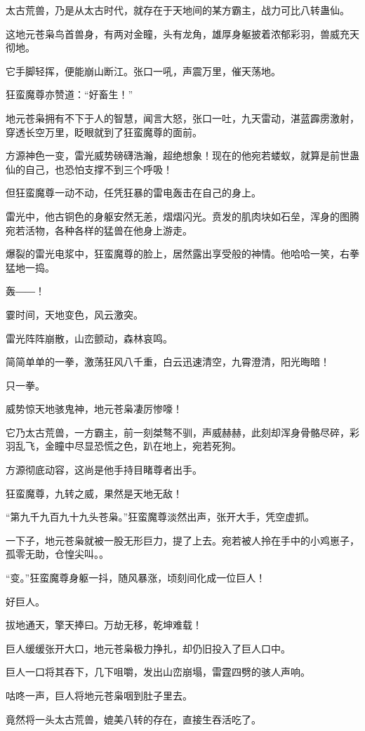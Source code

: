 \begin{this_body}
太古荒兽，乃是从太古时代，就存在于天地间的某方霸主，战力可比八转蛊仙。

这地元苍枭鸟首兽身，有两对金瞳，头有龙角，雄厚身躯披着浓郁彩羽，兽威充天彻地。

它手脚轻挥，便能崩山断江。张口一吼，声震万里，催天荡地。

狂蛮魔尊亦赞道：“好畜生！”

地元苍枭拥有不下于人的智慧，闻言大怒，张口一吐，九天雷动，湛蓝霹雳激射，穿透长空万里，眨眼就到了狂蛮魔尊的面前。

方源神色一变，雷光威势磅礴浩瀚，超绝想象！现在的他宛若蝼蚁，就算是前世蛊仙的自己，也恐怕支撑不到三个呼吸！

但狂蛮魔尊一动不动，任凭狂暴的雷电轰击在自己的身上。

雷光中，他古铜色的身躯安然无恙，熠熠闪光。贲发的肌肉块如石垒，浑身的图腾宛若活物，各种各样的猛兽在他身上游走。

爆裂的雷光电浆中，狂蛮魔尊的脸上，居然露出享受般的神情。他哈哈一笑，右拳猛地一捣。

轰――！

霎时间，天地变色，风云激突。

雷光阵阵崩散，山峦颤动，森林哀鸣。

简简单单的一拳，激荡狂风八千重，白云迅速清空，九霄澄清，阳光晦暗！

只一拳。

威势惊天地骇鬼神，地元苍枭凄厉惨嚎！

它乃太古荒兽，一方霸主，前一刻桀骜不驯，声威赫赫，此刻却浑身骨骼尽碎，彩羽乱飞，金瞳中尽显恐慌之色，趴在地上，宛若死狗。

方源彻底动容，这尚是他手持目睹尊者出手。

狂蛮魔尊，九转之威，果然是天地无敌！

“第九千九百九十九头苍枭。”狂蛮魔尊淡然出声，张开大手，凭空虚抓。

一下子，地元苍枭就被一股无形巨力，提了上去。宛若被人拎在手中的小鸡崽子，孤零无助，仓惶尖叫。。

“变。”狂蛮魔尊身躯一抖，随风暴涨，顷刻间化成一位巨人！

好巨人。

拔地通天，擎天捧曰。万劫无移，乾坤难载！

巨人缓缓张开大口，地元苍枭极力挣扎，却仍旧投入了巨人口中。

巨人一口将其吞下，几下咀嚼，发出山峦崩塌，雷霆四劈的骇人声响。

咕咚一声，巨人将地元苍枭咽到肚子里去。

竟然将一头太古荒兽，媲美八转的存在，直接生吞活吃了。


\end{this_body}
